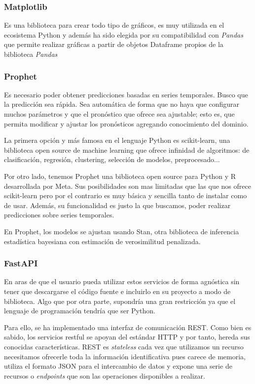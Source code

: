 \subsubsection{Matplotlib}
Es una biblioteca para crear todo tipo de gráficos, es muy utilizada en el ecosistema Python y además ha sido elegida por su compatibilidad con \textit{Pandas} que permite realizar gráficas a partir de objetos Dataframe propios de la biblioteca \textit{Pandas}

\subsubsection{Prophet}
Es necesario poder obtener predicciones basadas en series temporales. Busco que la predicción sea rápida. Sea automática de forma que no haya que configurar muchos parámetros y que el pronóstico que ofrece sea ajustable; esto es, que permita modificar y ajustar los pronósticos agregando conocimiento del dominio.

La primera opción y más famosa en el lenguaje Python es scikit-learn, una biblioteca open source de machine learning que ofrece infinidad de algoritmos: de clasificación, regresión, clustering, selección de modelos, preprocesado...

Por otro lado, tenemos Prophet una biblioteca open source para Python y R desarrollada por Meta. Sus posibilidades son mas limitadas que las que nos ofrece scikit-learn pero por el contrario es muy básica y sencilla tanto de instalar como de usar. Además, su funcionalidad es justo la que buscamos, poder realizar predicciones sobre series temporales.

En Prophet, los modelos se ajustan usando Stan, otra biblioteca de inferencia estadística bayesiana con estimación de verosimilitud penalizada.

\subsubsection{FastAPI}
En aras de que el usuario pueda utilizar estos servicios de forma agnóstica sin tener que descargarse el código fuente e incluirlo en su proyecto a modo de biblioteca. Algo que por otra parte, supondría una gran restricción ya que el lenguaje de programación tendría que ser Python.

Para ello, se ha implementado una interfaz de comunicación REST. Como bien es sabido, los servicios restful se apoyan del estándar HTTP y por tanto, hereda sus conocidas características. REST es \textit{stateless} cada vez que utilizamos un recurso necesitamos ofrecerle toda la información identificativa pues carece de memoria, utiliza el formato JSON para el intercambio de datos y expone una serie de recursos o \textit{endpoints} que son las operaciones disponibles a realizar.

